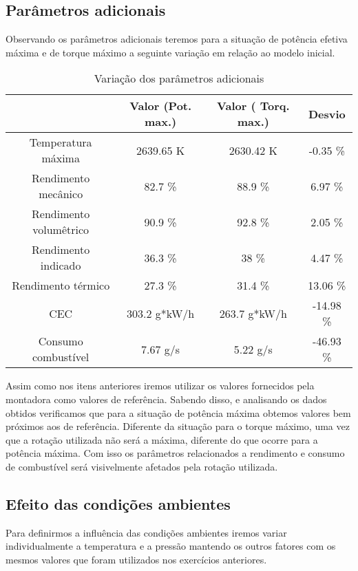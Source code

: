 \documentclass[a4paper]{article}
\begin{document}
\subsection{Parâmetros adicionais}
Observando os parâmetros adicionais teremos para a situação de potência efetiva máxima e de torque máximo a seguinte variação em relação ao modelo inicial.
\begin{table}[!ht]
    \centering
    \begin{tabular}{|c|c|c|c|}
    \hline
    & Valor (Pot. max.) & Valor ( Torq. max.) & Desvio\\
    \hline
    Temperatura máxima & 2639.65 K &  2630.42 K & -0.35 \% \\
    \hline
    Rendimento mecânico & 82.7 \% & 88.9 \% & 6.97 \%\\
    \hline
    Rendimento volumêtrico & 90.9 \% & 92.8 \%  & 2.05 \%\\
    \hline
    Rendimento indicado & 36.3 \% & 38 \% & 4.47 \%\\
    \hline
    Rendimento térmico & 27.3 \% & 31.4 \% & 13.06 \%\\
    \hline
    CEC & 303.2 g*kW/h & 263.7 g*kW/h & -14.98 \%\\
    \hline
    Consumo combustível & 7.67 g/s & 5.22 g/s & -46.93 \%\\
    \hline
    \end{tabular}
    \caption{Variação dos parâmetros adicionais}
\end{table}
\vspace{1mm}

Assim como nos itens anteriores iremos utilizar os valores fornecidos pela montadora como valores de referência. Sabendo disso, e analisando os dados obtidos verificamos que para a situação de potência máxima obtemos valores bem próximos aos de referência. Diferente da situação para o torque máximo, uma vez que a rotação utilizada não será a máxima, diferente do que ocorre para a potência máxima. Com isso os parâmetros relacionados a rendimento e consumo de combustível será visivelmente afetados pela rotação utilizada.


\subsection{Efeito das condições ambientes}
Para definirmos a influência das condições ambientes iremos variar individualmente a temperatura e a pressão mantendo os outros fatores com os mesmos valores que foram utilizados nos exercícios anteriores.
\end{document}
